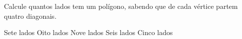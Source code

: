 Calcule quantos lados tem um polígono, sabendo que de cada vértice partem quatro diagonais.

Sete lados
Oito lados
Nove lados
Seis lados
Cinco lados


